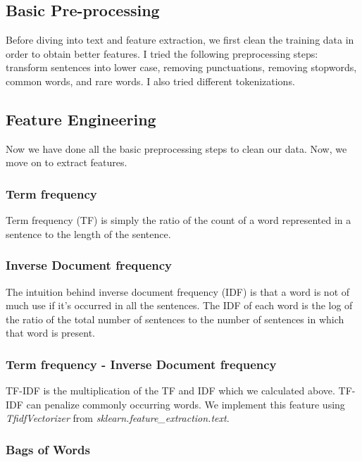 \subsection{\textbf{Basic Pre-processing}}

Before diving into text and feature extraction, we first clean the training data in order to obtain better features. I tried the following preprocessing steps: transform sentences into lower case, removing punctuations, removing stopwords, common words, and rare words. I also tried different tokenizations. %

\subsection{\textbf{Feature Engineering}}

Now we have done all the basic preprocessing steps to clean our data. Now, we move on to extract features.

\subsubsection{Term frequency}

Term frequency (TF) is simply the ratio of the count of a word represented in a sentence to the length of the sentence.

\subsubsection{Inverse Document frequency}

The intuition behind inverse document frequency (IDF) is that a word is not of much use if it's occurred in all the sentences. The IDF of each word is the log of the ratio of the total number of sentences to the number of sentences in which that word is present.

\subsubsection{Term frequency - Inverse Document frequency}

TF-IDF is the multiplication of the TF and IDF which we calculated above. TF-IDF can penalize commonly occurring words. We implement this feature using \textit{TfidfVectorizer} from \textit{sklearn.feature\_extraction.text}.

\subsubsection{Bags of Words}

